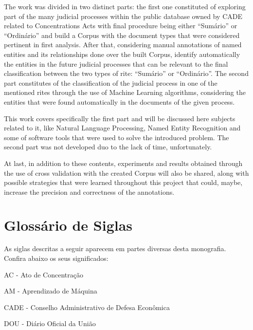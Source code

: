 \documentclass[11pt]{report}
\newcommand{\quotes}[1]{``#1''}
\begin{document}
The work was divided in two distinct parts: the first one constituted of exploring part of the many judicial processes within the public database owned by CADE related to Concentrations
Acts with final procedure being either \quotes{Sumário} or \quotes{Ordinário} and build a Corpus with the document types that were considered pertinent in first analysis. After that,
considering manual annotations of named entities and its relationships done over the built Corpus, identify automatically the entities in the future judicial processes that can be relevant
to the final classification between the two types of rite: \quotes{Sumário} or \quotes{Ordinário}. The second part constitutes of the classification of the judicial process in one of
the mentioned rites through the use of Machine Learning algorithms, considering the entities that were found automatically in the documents of the given process.

This work covers specifically the first part and will be discussed here subjects related to it, like Natural Language Processing, Named Entity Recognition and some of software tools that
were used to solve the introduced problem. The second part was not developed duo to the lack of time, unfortunately.

At last, in addition to these contents, experiments and results obtained through the use of cross validation with the created Corpus will also be shared, along with possible strategies that
were learned throughout this project that could, maybe, increase the precision and correctness of the annotations.

\pagebreak
\thispagestyle{empty}
\chapter*{Glossário de Siglas}

\indent\indent As siglas descritas a seguir aparecem em partes diversas desta monografia. Confira abaixo
os seus significados:

\vspace*{20px}

\noindent AC - Ato de Concentração

\vspace*{8px}
\noindent AM - Aprendizado de Máquina

\vspace*{8px}
\noindent CADE - Conselho Administrativo de Defesa Econômica

\vspace*{8px}
\noindent DOU - Diário Oficial da União
\end{document}
